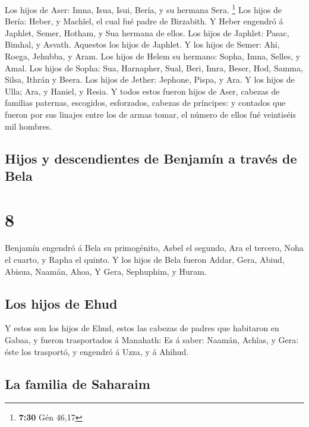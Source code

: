  Los hijos de Aser: Imna, Isua, Isui, Bería, y su hermana
Sera. \footnote{\textbf{7:30} Gén 46,17}  Los hijos de
Bería: Heber, y Machîel, el cual fué padre de Birzabith. 
Y Heber engendró á Japhlet, Semer, Hotham, y Sua hermana de ellos.
 Los hijos de Japhlet: Pasac, Bimhal, y Asvath. Aquestos
los hijos de Japhlet.  Y los hijos de Semer: Ahi, Roega,
Jehubba, y Aram.  Los hijos de Helem su hermano: Sopha,
Imna, Selles, y Amal.  Los hijos de Sopha: Sua,
Harnapher, Sual, Beri, Imra,  Beser, Hod, Samma, Silsa,
Ithrán y Beera.  Los hijos de Jether: Jephone, Pispa, y
Ara.  Y los hijos de Ulla; Ara, y Haniel, y Resia.
 Y todos estos fueron hijos de Aser, cabezas de familias
paternas, escogidos, esforzados, cabezas de príncipes: y contados que
fueron por sus linajes entre los de armas tomar, el número de ellos fué
veintiséis mil hombres.

\hypertarget{hijos-y-descendientes-de-benjamuxedn-a-travuxe9s-de-bela}{%
\subsection{Hijos y descendientes de Benjamín a través de
Bela}\label{hijos-y-descendientes-de-benjamuxedn-a-travuxe9s-de-bela}}

\hypertarget{section-7}{%
\section{8}\label{section-7}}

 Benjamín engendró á Bela su primogénito, Asbel el
segundo, Ara el tercero,  Noha el cuarto, y Rapha el
quinto.  Y los hijos de Bela fueron Addar, Gera, Abiud,
 Abisua, Naamán, Ahoa,  Y Gera, Sephuphim, y
Huram.

\hypertarget{los-hijos-de-ehud}{%
\subsection{Los hijos de Ehud}\label{los-hijos-de-ehud}}

 Y estos son los hijos de Ehud, estos las cabezas de
padres que habitaron en Gabaa, y fueron trasportados á Manahath:
 Es á saber: Naamán, Achîas, y Gera: éste los trasportó, y
engendró á Uzza, y á Ahihud.

\hypertarget{la-familia-de-saharaim}{%
\subsection{La familia de Saharaim}\label{la-familia-de-saharaim}}

